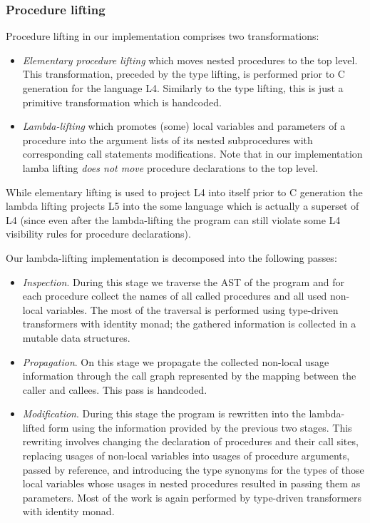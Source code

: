 \subsubsection{Procedure lifting}

Procedure lifting in our implementation comprises two transformations:

\begin{itemize}
\item \emph{Elementary procedure lifting} which moves nested procedures to the top level. This transformation, 
preceded by the type lifting, is performed prior to C generation for the language L4. Similarly to the type 
lifting, this is just a primitive transformation which is handcoded.

\item \emph{Lambda-lifting} which promotes (some) local variables and parameters of a procedure into the
argument lists of its nested subprocedures with corresponding call statements modifications. Note that in
our implementation lamba lifting \emph{does not move} procedure declarations to the top level.
\end{itemize}

While elementary lifting is used to project L4 into itself prior to C generation the lambda lifting
projects L5 into the some language which is actually a superset of L4 (since even after the lambda-lifting 
the program can still violate some L4 visibility rules for procedure declarations). 

Our lambda-lifting implementation is decomposed into the following passes:

\begin{itemize}
\item \emph{Inspection}. During this stage we traverse the AST of the program and for each procedure collect the 
names of all called procedures and all used non-local variables. The most of the 
traversal is performed using type-driven transformers with identity monad; the gathered information is 
collected in a mutable data structures. 

\item \emph{Propagation}. On this stage we propagate the collected non-local usage information through the call
graph represented by the mapping between the caller and callees. This pass is handcoded.

\item \emph{Modification}. During this stage the program is rewritten into the lambda-lifted form using the information
provided by the previous two stages. This rewriting involves changing the declaration of procedures and
their call sites, replacing usages of non-local variables into usages of procedure arguments, passed by 
reference, and introducing the type synonyms for the types of those local variables whose usages in 
nested procedures resulted in passing them as parameters. Most of the work is again performed by
type-driven transformers with identity monad.
\end{itemize}

